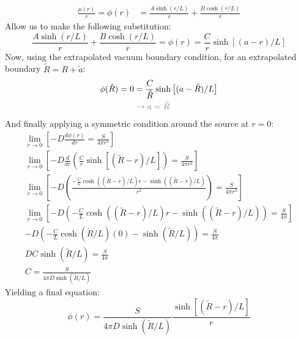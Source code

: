 \documentclass[11pt]{article}
\begin{document}
\begin{enumerate}
{\begin{align*}
        \frac{\mu(r)}{r}=\phi(r)&=\frac{A\sinh(r/L)}{r}+\frac{B\cosh(r/L)}{r}
    \end{align*}
    Allow us to make the following substitution:
    \begin{equation*}
        \frac{A\sinh(r/L)}{r}+\frac{B\cosh(r/L)}{r}=\phi(r)=\frac{C}{r}\sinh\left[(a-r)/L\right]
    \end{equation*}
    Now, using the extrapolated vacuum boundary condition, for an extrapolated boundary $\tilde{R}=R+\tilde{a}$:
    \begin{align*}
        \phi(\tilde{R})=0&=\frac{C}{\tilde{R}}\sinh\left[(a-\tilde{R})/L\right]\\
        &\color{gray}\rightarrow a=\tilde{R}
    \end{align*}
    And finally applying a symmetric condition around the source at $r=0$:
    \begin{gather*}
        \lim_{r\rightarrow0}\left[-D\frac{d\phi(r)}{dr}=\frac{S}{4\pi r^2}\right]\\
        \lim_{r\rightarrow0}\left[-D\frac{d}{dr}\left(\frac{C}{r}\sinh\left[(\tilde{R}-r)/L\right]\right)=\frac{S}{4\pi r^2}\right]\\
        \lim_{r\rightarrow0}\left[-D
            \left(\frac{-\frac{C}{L}\cosh((\tilde{R}-r)/L)r-\sinh((\tilde{R}-r)/L)}{r^2}\right)
        =\frac{S}{4\pi r^2}\right]\\
        \lim_{r\rightarrow0}\left[-D
            \left(-\frac{C}{L}\cosh((\tilde{R}-r)/L)r-\sinh((\tilde{R}-r)/L)\right)
        =\frac{S}{4\pi}\right]\\
        -D
            \left(-\frac{C}{L}\cosh(\tilde{R}/L)(0)-\sinh(\tilde{R}/L)\right)
        =\frac{S}{4\pi}\\
        DC\sinh(\tilde{R}/L)=\frac{S}{4\pi}\\
        C=\frac{S}{4\pi D\sinh(\tilde{R}/L)}
    \end{gather*}
    Yielding a final equation:
    \begin{equation}
        \boxed{\phi(r)=\frac{S}{4\pi D\sinh(\tilde{R}/L)}\frac{\sinh\left[(\tilde{R}-r)/L\right]}{r}}
    \end{equation}
    
    

}
\end{enumerate}
\end{document}
